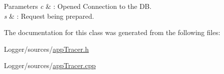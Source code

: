 \begin{DoxyParams}{Parameters}
{\em c} & \+: Opened Connection to the D\+B. \\
\hline
{\em s} & \+: Request being prepared. \\
\hline
\end{DoxyParams}


The documentation for this class was generated from the following files\+:\begin{DoxyCompactItemize}
\item 
Logger/sources/\hyperlink{app_tracer_8h}{app\+Tracer.\+h}\item 
Logger/sources/\hyperlink{app_tracer_8cpp}{app\+Tracer.\+cpp}\end{DoxyCompactItemize}
